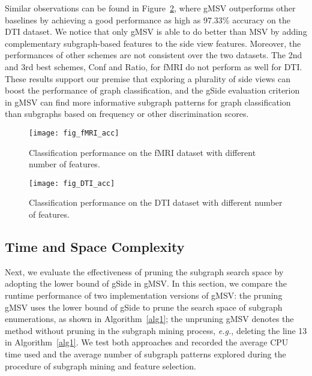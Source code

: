 \documentclass[conference]{IEEEtran}
\newcommand{\gscore}[0]{gSide}
\newcommand{\galgo}[0]{gMSV}
\newcommand{\duga}[0]{Conf}
\newcommand{\dugb}[0]{Ratio}
\newcommand{\side}[0]{MSV}
\begin{document}
Similar observations can be found in Figure~\ref{fig:DTI}, where {\galgo} outperforms other baselines by achieving a good performance as high as 97.33\% accuracy on the DTI dataset. We notice that only {\galgo} is able to do better than {\side} by adding complementary subgraph-based features to the side view features. Moreover, the performances of other schemes are not consistent over the two datasets. The 2nd and 3rd best schemes, {\duga} and {\dugb}, for fMRI do not perform as well for DTI. These results support our premise that exploring a plurality of side views can boost the performance of graph classification, and the {\gscore} evaluation criterion in {\galgo} can find more informative subgraph patterns for graph classification than subgraphs based on frequency or other discrimination scores.

\begin{figure}[t]
\centering
    \begin{minipage}[l]{\columnwidth}
      \centering
      \texttt{[image: fig\_fMRI\_acc]}
    \end{minipage}
\caption{Classification performance on the fMRI dataset with different number of features.}\label{fig:fMRI}
\end{figure}\begin{figure}[t]
\centering
    \begin{minipage}[l]{\columnwidth}
      \centering
      \texttt{[image: fig\_DTI\_acc]}
    \end{minipage}
\caption{Classification performance on the DTI dataset with different number of features.}\label{fig:DTI}
\end{figure}\subsection{Time and Space Complexity}

Next, we evaluate the effectiveness of pruning the subgraph search space by adopting the lower bound of {\gscore} in {\galgo}. In this section, we compare the runtime performance of two implementation versions of {\galgo}: the pruning {\galgo} uses the lower bound of {\gscore} to prune the search space of subgraph enumerations, as shown in Algorithm~\ref{alg1}; the unpruning {\galgo} denotes the method without pruning in the subgraph mining process, \emph{e.g.}, deleting the line 13 in Algorithm~\ref{alg1}. We test both approaches and recorded the average CPU time used and the average number of subgraph patterns explored during the procedure of subgraph mining and feature selection.
\end{document}

